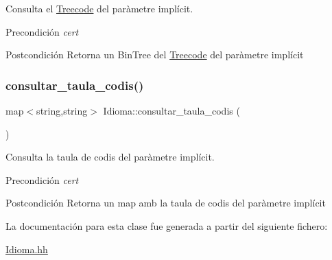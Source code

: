 Consulta el \hyperlink{class_treecode}{Treecode} del paràmetre implícit. 

\begin{DoxyPrecond}{Precondición}
{\itshape cert} 
\end{DoxyPrecond}
\begin{DoxyPostcond}{Postcondición}
Retorna un Bin\+Tree del \hyperlink{class_treecode}{Treecode} del paràmetre implícit 
\end{DoxyPostcond}
\mbox{\label{class_idioma_a5cb257a60b1ee7cc6b912de01913117e}} 
\subsubsection{\texorpdfstring{consultar\+\_\+taula\+\_\+codis()}{consultar\_taula\_codis()}}
{\footnotesize\ttfamily map$<$string,string$>$ Idioma\+::consultar\+\_\+taula\+\_\+codis (\begin{DoxyParamCaption}{ }\end{DoxyParamCaption})}



Consulta la taula de codis del paràmetre implícit. 

\begin{DoxyPrecond}{Precondición}
{\itshape cert} 
\end{DoxyPrecond}
\begin{DoxyPostcond}{Postcondición}
Retorna un map amb la taula de codis del paràmetre implícit 
\end{DoxyPostcond}


La documentación para esta clase fue generada a partir del siguiente fichero\+:\begin{DoxyCompactItemize}
\item 
\hyperlink{_idioma_8hh}{Idioma.\+hh}\end{DoxyCompactItemize}
